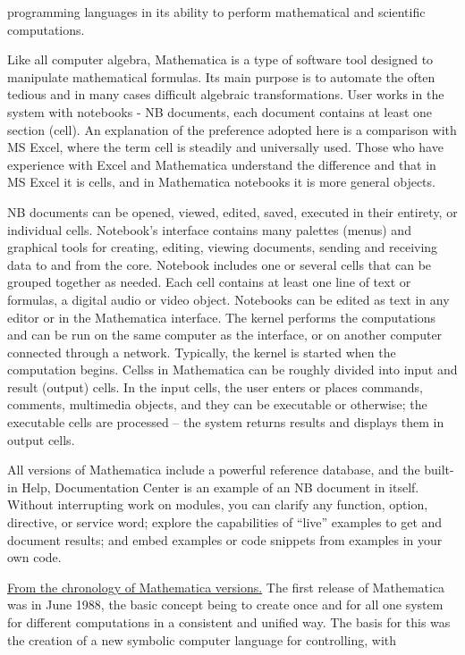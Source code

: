 \documentclass{article}
\begin{document}
\begin{multicols}{2}
programming languages in its ability to perform mathematical and scientific computations.
\par
Like all computer algebra, Mathematica is a type
of software tool designed to manipulate mathematical
formulas. Its main purpose is to automate the often
tedious and in many cases difficult algebraic transformations. User works in the system with notebooks - NB
documents, each document contains at least one section
(cell). An explanation of the preference adopted here is
a comparison with MS Excel, where the term cell is
steadily and universally used. Those who have experience
with Excel and Mathematica understand the difference
and that in MS Excel it is cells, and in Mathematica
notebooks it is more general objects.
\par
NB documents can be opened, viewed, edited, saved,
executed in their entirety, or individual cells. Notebook’s
interface contains many palettes (menus) and graphical
tools for creating, editing, viewing documents, sending
and receiving data to and from the core. Notebook
includes one or several cells that can be grouped together
as needed. Each cell contains at least one line of text or
formulas, a digital audio or video object. Notebooks can
be edited as text in any editor or in the Mathematica
interface. The kernel performs the computations and
can be run on the same computer as the interface,
or on another computer connected through a network.
Typically, the kernel is started when the computation
begins. Cellss in Mathematica can be roughly divided
into input and result (output) cells. In the input cells, the
user enters or places commands, comments, multimedia
objects, and they can be executable or otherwise; the
executable cells are processed – the system returns results
and displays them in output cells.
\par
All versions of Mathematica include a powerful reference database, and the built-in Help, Documentation
Center is an example of an NB document in itself.
Without interrupting work on modules, you can clarify
any function, option, directive, or service word; explore
the capabilities of “live” examples to get and document
results; and embed examples or code snippets from
examples in your own code.
\par
\underline{From the chronology of Mathematica versions.} The
first release of Mathematica was in June 1988, the
basic concept being to create once and for all one
system for different computations in a consistent and
unified way. The basis for this was the creation of a
new symbolic computer language for controlling, with

\end{multicols}
\end{document}
